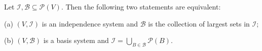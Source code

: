 Let $\mathcal{I}, \mathcal{B} \subseteq \mathcal{P}(V)$. Then the following two statements are equivalent:

(a) $(V, \mathcal{I})$ is an independence system and $\mathcal{B}$ is the collection of largest sets in $\mathcal{I}$;

(b) $(V, \mathcal{B})$ is a basis system and $\mathcal{I} = \bigcup_{B \in \mathcal{B}} \mathcal{P}(B)$.

